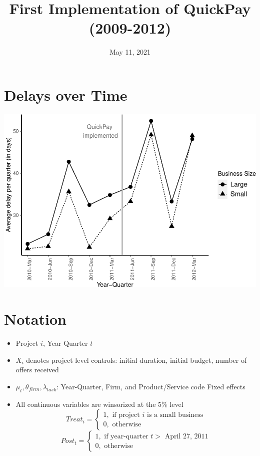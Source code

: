 \documentclass[
]{article}
\title{First Implementation of QuickPay (2009-2012)}
\author{}
\date{\vspace{-2.5em}May 11, 2021}
\providecommand{\tightlist}{%
  \setlength{\itemsep}{0pt}\setlength{\parskip}{0pt}}
\begin{document}
\maketitle

\hypertarget{delays-over-time}{%
\section{Delays over Time}\label{delays-over-time}}

\includegraphics{qp_first_implementation_files/figure-latex/plot-1.pdf}

\hypertarget{notation}{%
\section{Notation}\label{notation}}

\begin{itemize}
\tightlist
\item
  Project \(i\), Year-Quarter \(t\)
\item
  \(X_i\) denotes project level controls: initial duration, initial
  budget, number of offers received
\item
  \(\mu_t,\theta_{firm},\lambda_{task}\): Year-Quarter, Firm, and
  Product/Service code Fixed effects
\item
  All continuous variables are winsorized at the 5\% level
  \[ Treat_i = \begin{cases} 1, \text{ if project } i \text{ is a small business}\\
  0, \text{ otherwise} \end{cases}\]
  \[ Post_t = \begin{cases} 1, \text{ if year-quarter } t > \text{ April 27, 2011}\\
  0, \text{ otherwise} \end{cases}\]
\end{itemize}
\end{document}

